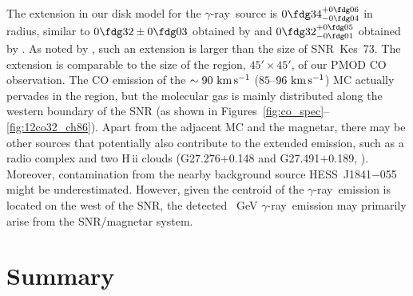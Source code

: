 \documentclass[12pt,preprint]{aastex}
\newcommand{\kms}{\,{\km\ps}}       \newcommand{\m}{\,{\rm m}}
\newcommand{\twCO}{$^{12}{\rm CO}$}
\newcommand{\thCO}{$^{13}{\rm CO}$}
\newcommand{\Jotz}{$J$=1-0}
\newcommand{\Jtto}{$J$=2-1}
\newcommand{\gray}{{\rm $\gamma$-ray}}
\begin{document}
The extension in our disk model for the \gray\ source
is $0\fdg34^{+0\fdg06}_{-0\fdg04}$ in radius,
similar to
$0\fdg32\pm0\fdg03$ obtained by \citet{Lijian2017magnetar} and
$0\fdg32^{+0\fdg05}_{-0\fdg01}$ obtained by \citet{Yeung2017kes73}.
As noted by \citet{Lijian2017magnetar}, such an extension
is larger than the size of SNR~Kes~73.
The extension is comparable to the size of the  region,%
$45'\times45'$,
of our PMOD CO observation. %
The CO emission of the $\sim90\kms$ ($85$--$96\kms$) MC actually pervades
in the region, but the molecular gas is mainly distributed
along the western boundary of the SNR (as shown in
Figures~\ref{fig:co_spec}--\ref{fig:12co32_ch86}).
Apart from the adjacent MC and the magnetar, there may be other
sources that potentially also contribute to the extended emission,
such as a radio complex \citep{Lijian2017magnetar} and
two H\,{\sc ii} clouds (G27.276$+$0.148 and G27.491$+$0.189,
\citealt{Yeung2017kes73}).
Moreover, contamination from the nearby %
background source HESS~J1841$-$055
\citep{Aharonian2008hess}
might be underestimated.
However, given the centroid of the \gray\ emission 
is located on the west of the SNR, 
the detected \Fermi\ GeV \gray\ emission may primarily
arise from the SNR/magnetar system.

\section{Summary}
\end{document}
